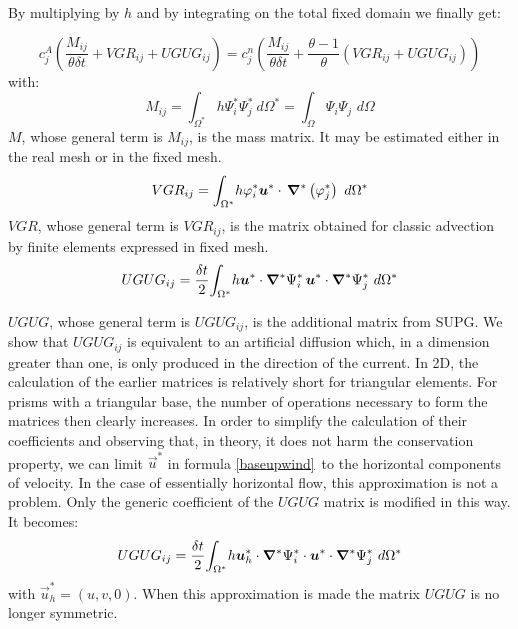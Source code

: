 By multiplying by $h$ and by integrating on the total fixed domain we finally get:%

\begin{equation}
c_{j}^{A}\left(  \dfrac{M_{ij}}{\theta\delta t}+ VGR_{ij}+UGUG_{ij}\right)
=c_{j}^{n}\left(  \dfrac{M_{ij}}{\theta\delta t}+ \dfrac{\theta-1}{\theta
}\left(  VGR_{ij}+UGUG_{ij}\right)  \right)
\end{equation}
with:%
\begin{equation}
M_{ij}=
{\displaystyle\int\nolimits_{\Omega^{\ast}}}
h\Psi_{i}^{\ast}\Psi_{j}^{\ast}~d\Omega^{\ast}=%
{\displaystyle\int\nolimits_{\Omega}}
\Psi_{i}\Psi_{j\,}~d\Omega
\end{equation}
$M$, whose general term is $M_{ij}$, is the mass matrix. It may be estimated
either in the real mesh or in the fixed mesh.%
\begin{equation}
VGR_{ij}=%
{\displaystyle\int\nolimits_{\Omega^{\ast}}}
h\varphi_{i}^{\ast}\vec{u}^{\ast}\cdot\,\Grad^{\ast}\left(
\varphi_{j}^{\ast}\right)  ~d\Omega^{\ast}%
\end{equation}
$VGR$, whose general term is $VGR_{ij}$, is the matrix obtained for classic
advection by finite elements expressed in fixed mesh.%
\begin{equation}
UGUG_{ij}=\dfrac{\delta t}{2}%
{\displaystyle\int\nolimits_{\Omega^{\ast}}}
h\vec{u}^{\ast}\cdot\Grad^{\ast}  \Psi_{i}^{\ast}
\,\vec{u}^{\ast}\cdot\Grad^{\ast} \Psi_{j}^{\ast} ~d\Omega^{\ast}%
\end{equation}

$UGUG$, whose general term is $UGUG_{ij}$, is the additional matrix from SUPG.
We show \cite{moulin93} that $UGUG_{ij}$ is equivalent to an artificial
diffusion which, in a dimension greater than one, is only produced in the
direction of the current. In 2D, the calculation of the earlier matrices is
relatively short for triangular elements. For prisms with a triangular base,
the number of operations necessary to form the matrices then clearly
increases. In order to simplify the calculation of their coefficients and
observing that, in theory, it does not harm the conservation property, we can
limit $\vec{u}^{\ast}$ in formula \ref{baseupwind}\ to the horizontal
components of velocity. In the case of essentially horizontal flow, this
approximation is not a problem. Only the generic coefficient of the $UGUG$
matrix is modified in this way. It becomes:
\begin{equation}
UGUG_{ij}=\dfrac{\delta t}{2}{\displaystyle\int\nolimits_{\Omega^{\ast}}}
h\vec{u}_{h}^{\ast}\cdot\Grad^{\ast}\Psi_{i}^{\ast} \cdot\vec{u}^{\ast}\cdot
\Grad^{\ast} \Psi_{j}^{\ast} ~d\Omega^{\ast}%
\end{equation}
with $\vec{u}_{h}^{\ast}=(u,v,0)$. When this approximation is made
the matrix $UGUG$ is no longer symmetric.

